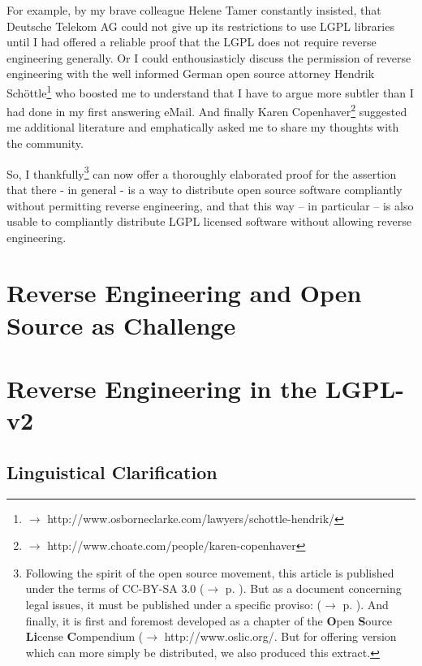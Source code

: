 \documentclass[DIV=calc,BCOR=5mm,12pt,headings=small,oneside,toc=bib]{scrartcl}
\begin{document}
For example, by my brave colleague Helene Tamer constantly insisted, that
Deutsche Telekom AG could not give up its restrictions to use LGPL libraries
until I had offered a reliable proof that the LGPL does not require reverse
engineering generally. Or I could enthousiasticly discuss the permission of
reverse engineering with the well informed German open source attorney Hendrik
Schöttle\footnote{$\rightarrow$
http://www.osborneclarke.com/lawyers/schottle-hendrik/} who boosted me to
understand that I have to argue more subtler than I had done in my first
answering eMail. And finally Karen Copenhaver\footnote{$\rightarrow$
http://www.choate.com/people/karen-copenhaver} suggested me additional
literature and emphatically asked me to share my thoughts with the community.

So, I thankfully\footnote{Following the spirit of the open source movement, this
article is published under the terms of CC-BY-SA 3.0 ($\rightarrow$ p.
\pageref{License}). But as a document concerning legal issues, it must  be
published under a specific proviso: ($\rightarrow$ p. \pageref{Disclaimer}). And
finally, it is first and foremost developed as a chapter of the \textbf{O}pen
\textbf{S}ource \textbf{Li}cense \textbf{C}ompendium ($\rightarrow$
http://www.oslic.org/. But for offering version which can more simply be
distributed, we also produced this extract.} can now offer a thoroughly
elaborated proof for the assertion that there - in general - is a way to
distribute open source software compliantly without permitting reverse
engineering, and that this way -- in particular -- is also usable to compliantly
distribute LGPL licensed software without allowing reverse engineering.

\footnotesize
\tableofcontents


\section{Reverse Engineering and Open Source as Challenge}

\section{Reverse Engineering in the LGPL-v2}

\subsection{Linguistical Clarification}

\end{document}
